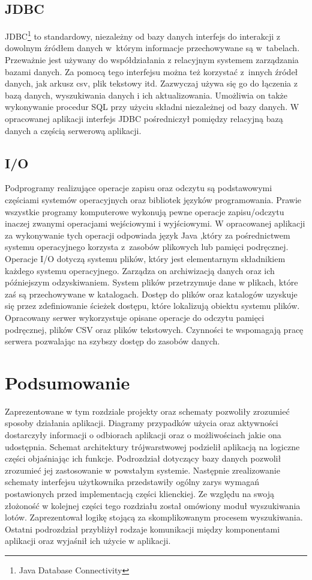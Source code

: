 \documentclass[12pt, twoside]{report}
\begin{document}
\subsection{JDBC}
JDBC\footnote{Java Database Connectivity} to standardowy, niezależny od bazy danych interfejs do interakcji z dowolnym źródłem danych w~którym informacje przechowywane są w~tabelach. Przeważnie jest używany do współdziałania z relacyjnym systemem zarządzania bazami danych. Za pomocą tego interfejsu można też korzystać z~innych źródeł danych, jak arkusz csv, plik tekstowy itd. Zazwyczaj używa się go do łączenia z bazą danych, wyszukiwania danych i ich aktualizowania. Umożliwia on także wykonywanie procedur SQL przy użyciu składni niezależnej od bazy danych\cite{jdbc}. W opracowanej aplikacji interfejs JDBC pośredniczył pomiędzy relacyjną bazą danych a częścią serwerową aplikacji.


\subsection{I/O}
Podprogramy realizujące operacje zapisu oraz odczytu są podstawowymi częściami systemów operacyjnych oraz bibliotek języków programowania. Prawie wszystkie programy komputerowe wykonują pewne operacje zapisu/odczytu inaczej zwanymi operacjami wejściowymi i wyjściowymi. W opracowanej aplikacji za wykonywanie tych operacji odpowiada język Java ,który za pośrednictwem systemu operacyjnego korzysta z~zasobów plikowych lub pamięci podręcznej. Operacje I/O dotyczą systemu plików, który jest elementarnym składnikiem każdego systemu operacyjnego. Zarządza on archiwizacją danych oraz ich późniejszym odzyskiwaniem. System plików przetrzymuje dane w plikach, które zaś są przechowywane w katalogach. Dostęp do plików oraz katalogów uzyskuje się przez zdefiniowanie ścieżek dostępu, które lokalizują obiektu systemu plików\cite{i/o}.
Opracowany serwer wykorzystuje opisane operacje do odczytu pamięci podręcznej, plików CSV oraz plików tekstowych. Czynności te wspomagają pracę serwera pozwalając na szybszy dostęp do zasobów danych.

\section{Podsumowanie}
Zaprezentowane w tym rozdziale projekty oraz schematy pozwoliły zrozumieć sposoby działania aplikacji. Diagramy przypadków użycia oraz aktywności dostarczyły informacji o odbiorach aplikacji oraz o możliwościach jakie ona udostępnia. Schemat architektury trójwarstwowej podzielił aplikacją na logiczne części objaśniając ich funkcje. Podrozdział dotyczący bazy danych pozwolił zrozumieć jej zastosowanie w powstałym systemie. Następnie zrealizowanie schematy interfejsu użytkownika przedstawiły ogólny zarys wymagań postawionych przed implementacją części klienckiej. Ze względu na swoją złożoność w kolejnej części tego rozdziału został omówiony moduł wyszukiwania lotów. Zaprezentował logikę stojącą za skomplikowanym procesem wyszukiwania. Ostatni podrozdział przybliżył rodzaje komunikacji między komponentami aplikacji oraz wyjaśnił ich użycie w aplikacji.
\end{document}
